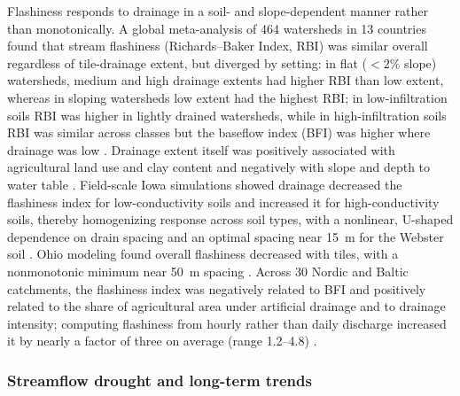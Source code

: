 Flashiness responds to drainage in a soil- and slope-dependent manner rather than monotonically. A global meta-analysis of 464 watersheds in 13 countries found that stream flashiness (Richards--Baker Index, RBI) was similar overall regardless of tile-drainage extent, but diverged by setting: in flat ($<2$\% slope) watersheds, medium and high drainage extents had higher RBI than low extent, whereas in sloping watersheds low extent had the highest RBI; in low-infiltration soils RBI was higher in lightly drained watersheds, while in high-infiltration soils RBI was similar across classes but the baseflow index (BFI) was higher where drainage was low \parencite{Zhou2025}. Drainage extent itself was positively associated with agricultural land use and clay content and negatively with slope and depth to water table \parencite{Zhou2025}. Field-scale Iowa simulations showed drainage decreased the flashiness index for low-conductivity soils and increased it for high-conductivity soils, thereby homogenizing response across soil types, with a nonlinear, U-shaped dependence on drain spacing and an optimal spacing near 15~m for the Webster soil \parencite{Sloan2016}. Ohio modeling found overall flashiness decreased with tiles, with a nonmonotonic minimum near 50~m spacing \parencite{Rathore2025}. Across 30 Nordic and Baltic catchments, the flashiness index was negatively related to BFI and positively related to the share of agricultural area under artificial drainage and to drainage intensity; computing flashiness from hourly rather than daily discharge increased it by nearly a factor of three on average (range 1.2--4.8) \parencite{Deelstra2014,Deelstra2014b}.

\subsubsection{Streamflow drought and long-term trends}

